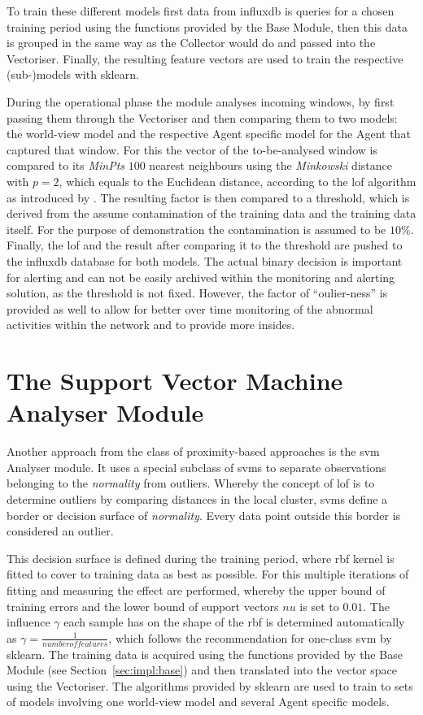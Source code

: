 To train these different models first data from \gls{influxdb} is queries for a chosen training period using the functions provided by the Base Module, then this data is grouped in the same way as the Collector would do and passed into the Vectoriser.
Finally, the resulting feature vectors are used to train the respective (sub-)models with \gls{sklearn}.

During the operational phase the module analyses incoming windows, by first passing them through the Vectoriser and then comparing them to two models: the world-view model and the respective Agent specific model for the Agent that captured that window.
For this the vector of the to-be-analysed window is compared to its \emph{MinPts} $100$ nearest neighbours using the \emph{Minkowski} distance with $p=2$, which equals to the Euclidean distance, according to the \gls{lof} algorithm as introduced by \textcite{Breunig2000}.
The resulting factor is then compared to a threshold, which is derived from the assume contamination of the training data and the training data itself. For the purpose of demonstration the contamination is assumed to be $10\%$.
Finally, the \gls{lof} and the result after comparing it to the threshold are pushed to the \gls{influxdb} database for both models.
The actual binary decision is important for alerting and can not be easily archived within the monitoring and alerting solution, as the threshold is not fixed.
However, the factor of \enquote{oulier-ness} is provided as well to allow for better over time monitoring of the abnormal activities within the network and to provide more insides.

\section{The Support Vector Machine Analyser Module}
\label{sec:impl:svm}

Another approach from the class of proximity-based approaches is the \gls{svm} Analyser module. It uses a special subclass of \glspl{svm}
to separate observations belonging to the \emph{normality} from outliers.
Whereby the concept of \gls{lof} is to determine outliers by comparing distances in the local cluster, \glspl{svm} define a border or decision surface of \emph{normality}. Every data point outside this border is considered an outlier.

This decision surface is defined during the training period, where \gls{rbf} kernel is fitted to cover to training data as best as possible. For this multiple iterations of fitting and measuring the effect are performed, whereby the upper bound of training errors and the lower bound of support vectors $nu$ is set to $0.01$. The influence $\gamma$ each sample has on the shape of the \gls{rbf} is determined automatically as $\gamma = \frac{1}{number of features}$, which follows the recommendation for one-class \gls{svm} by \gls{sklearn}.
The training data is acquired using the functions provided by the Base Module (see Section~\ref{sec:impl:base}) and then translated into the vector space using the Vectoriser.
The algorithms provided by \gls{sklearn} are used to train to sets of models involving one world-view model and several Agent specific models.

